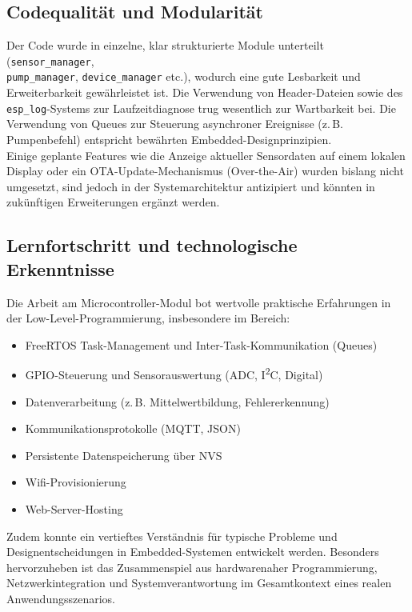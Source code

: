 \subsection{Codequalität und Modularität}

Der Code wurde in einzelne, klar strukturierte Module unterteilt (\texttt{sensor\_manager}, \\\texttt{pump\_manager}, \texttt{device\_manager} etc.), wodurch eine gute Lesbarkeit und Erweiterbarkeit gewährleistet ist. Die Verwendung von Header-Dateien sowie des \texttt{esp\_log}-Systems zur Laufzeitdiagnose trug wesentlich zur Wartbarkeit bei. Die Verwendung von Queues zur Steuerung asynchroner Ereignisse (z.\,B. Pumpenbefehl) entspricht bewährten Embedded-Designprinzipien.
\\
Einige geplante Features wie die Anzeige aktueller Sensordaten auf einem lokalen Display oder ein OTA-Update-Mechanismus (Over-the-Air) wurden bislang nicht umgesetzt, sind jedoch in der Systemarchitektur antizipiert und könnten in zukünftigen Erweiterungen ergänzt werden.

\subsection{Lernfortschritt und technologische Erkenntnisse}

Die Arbeit am Microcontroller-Modul bot wertvolle praktische Erfahrungen in der Low-Level-Programmierung, insbesondere im Bereich:
\\
\begin{itemize}
	\item FreeRTOS Task-Management und Inter-Task-Kommunikation (Queues)
	\item GPIO-Steuerung und Sensorauswertung (ADC, I\textsuperscript{2}C, Digital)
	\item Datenverarbeitung (z.\,B. Mittelwertbildung, Fehlererkennung)
	\item Kommunikationsprotokolle (MQTT, JSON)
	\item Persistente Datenspeicherung über NVS
	\item Wifi-Provisionierung
	\item Web-Server-Hosting
\end{itemize}
\vspace{1em}

\noindent Zudem konnte ein vertieftes Verständnis für typische Probleme und Designentscheidungen in Embedded-Systemen entwickelt werden. Besonders hervorzuheben ist das Zusammenspiel aus hardwarenaher Programmierung, Netzwerkintegration und Systemverantwortung im Gesamtkontext eines realen Anwendungsszenarios.


